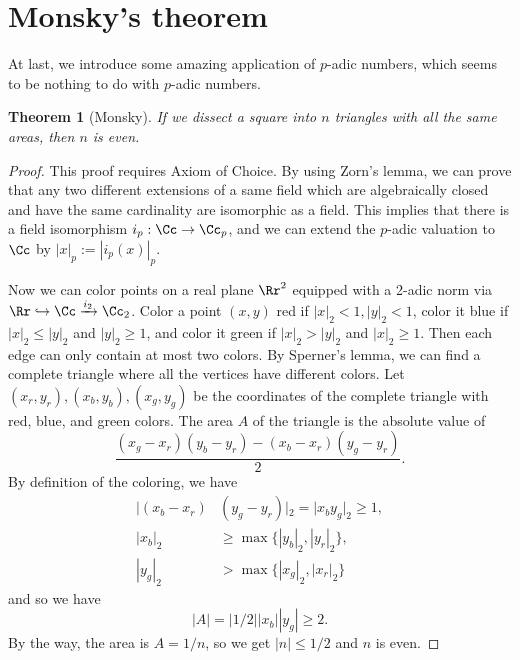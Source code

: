 \documentclass{article}
\newtheorem{theorem}{Theorem}
\begin{document}
\section{Monsky's theorem}
At last, we introduce some amazing application of $p$-adic numbers, which seems to be nothing to do with $p$-adic numbers. 
\begin{theorem}[Monsky]
If we dissect a square into $n$ triangles with all the same areas, then $n$ is even. 
\end{theorem}
\begin{proof}
This proof requires Axiom of Choice. 
By using Zorn's lemma, we can prove that any two different extensions of a same field which are algebraically closed and have the same cardinality are isomorphic as a field. This implies that there is a field isomorphism $i_{p}:\Cc \to \Cc_{p}$, and we can extend the $p$-adic valuation to $\Cc$ by $|x|_{p}:= |i_{p}(x)|_{p}$. 

Now we can color points on a real plane $\Rr^{2}$ equipped with a 2-adic norm via $\Rr\hookrightarrow \Cc \xrightarrow{i_{2}} \Cc_{2}$. 
Color a point $(x, y)$ red if $|x|_2 < 1, |y|_2<1$, color it blue if $|x|_2\leq |y|_2$ and $|y|_2\geq 1$, and color it green if $|x| _2> |y|_2$ and $|x|_2\geq 1$. 
Then each edge can only contain at most two colors. By Sperner's lemma, we can find a complete triangle where all the vertices have different colors. 
Let $(x_{r}, y_{r}), (x_{b}, y_{b}), (x_{g}, y_{g})$ be the coordinates of the complete triangle with red, blue, and green colors. 
The area $A$ of the triangle is the absolute value of 
$$
\frac{(x_g - x_r)(y_b - y_r) - (x_b - x_r)(y_g - y_r)}{2}.
$$
By definition of the coloring, we have 
\begin{align*}
|(x_b - x_r)&(y_g - y_r)|_2 = |x_{b}y_{g}|_2 \geq 1,  \\
|x_{b}|_2 &\geq \max\{ |y_{b}|_2, |y_{r}|_2\}, \\
|y_{g}|_2 &> \max\{|x_{g}|_2, |x_{r}|_2\}
\end{align*}
and so we have
$$
|A| = |1/2||x_b||y_g| \geq 2.
$$
By the way, the area is $A = 1/n$, so we get $|n| \leq 1/2$ and $n$ is even. 
\end{proof}
\end{document}
